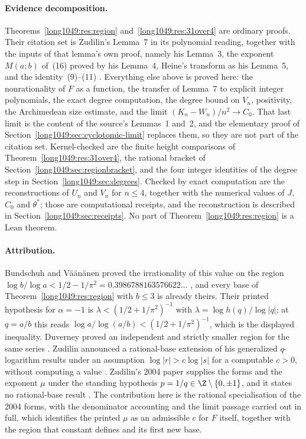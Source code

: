 \paragraph{Evidence decomposition.}
Theorems~\ref{long1049:res:region} and~\ref{long1049:res:31over4} are ordinary proofs.  Their
citation set is Zudilin's Lemma~7 in its polynomial reading, together with the
inputs of that lemma's own proof, namely his Lemma~3, the exponent $M(a;b)$
of~(16) proved by his Lemma~4, Heine's transform as his Lemma~5, and the
identity~(9)--(11) \cite{zudilin2004}.  Everything else above is proved here:
the nonrationality of $F$ as a function, the transfer of Lemma~7 to explicit
integer polynomials, the exact degree computation, the degree bound on $V_n$,
positivity, the Archimedean size estimate, and the limit
$(K_n-W_n)/n^{2}\to C_0$.  That last limit is the content of the source's
Lemmas~1 and~2, and the elementary proof of
Section~\ref{long1049:sec:cyclotomic-limit} replaces them, so they are not part of the
citation set.  Kernel-checked are the finite height comparisons of
Theorem~\ref{long1049:res:31over4}, the rational bracket of
Section~\ref{long1049:sec:regionbracket}, and the four integer identities of the degree
step in Section~\ref{long1049:sec:degrees}.  Checked by exact computation are the
reconstructions of $U_n$ and $V_n$ for $n\le4$, together with the numerical
values of $J$, $C_0$ and $\theta^{*}$; those are computational receipts, and
the reconstruction is described in Section~\ref{long1049:sec:receipts}.  No part of
Theorem~\ref{long1049:res:region} is a Lean theorem.

\paragraph{Attribution.}
Bundschuh and V\"a\"an\"anen proved the irrationality of this value on the
region $\log b/\log a<1/2-1/\pi^{2}=0.3986788163576622\ldots$
\cite[Thm.~2, p.~177; hypotheses pp.~175--176]{bv1994}, and every base of
Theorem~\ref{long1049:res:region} with $b\le3$ is already theirs.  Their printed
hypothesis for $\alpha=-1$ is $\lambda<(1/2+1/\pi^{2})^{-1}$ with
$\lambda=\log h(q)/\log|q|$; at $q=a/b$ this reads
$\log a/\log(a/b)<(1/2+1/\pi^{2})^{-1}$, which is the displayed inequality.  Duverney proved an
independent and strictly smaller region for the same series
\cite[Th\'eor\`eme~2, p.~174]{duverney1996}.  Zudilin announced a rational-base
extension of his generalized $q$-logarithm results under an assumption
$\log|r|>c\log|s|$ for a computable $c>0$, without computing a value
\cite{zudilin2016}.  Zudilin's 2004 paper supplies the forms and the exponent
$\mu$ under the standing hypothesis $p=1/q\in\Z\mathbin{\backslash}\{0,\pm1\}$, and it
states no rational-base result \cite[Sec.~2, p.~154; Thm.~1]{zudilin2004}.  The
contribution here is the rational specialisation of the 2004 forms, with the
denominator accounting and the limit passage carried out in full, which
identifies the printed $\mu$ as an admissible $c$ for $F$ itself, together with
the region that constant defines and its first new base.

